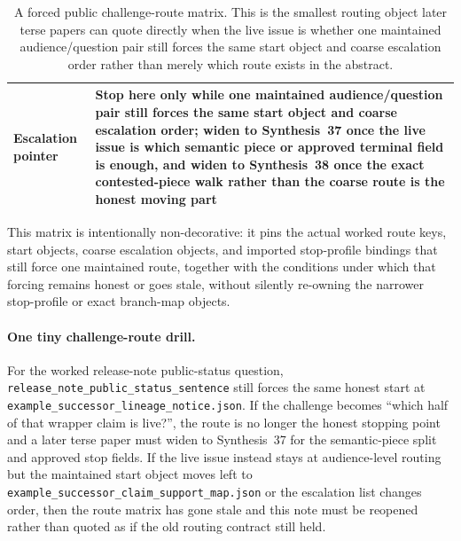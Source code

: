 \documentclass[11pt]{article}
\begin{document}
\begin{table}[t]
\begin{tabularx}{\linewidth}{@{}lX@{}}
Escalation pointer & Stop here only while one maintained audience/question pair still forces the same start object and coarse escalation order; widen to Synthesis~37 once the live issue is which semantic piece or approved terminal field is enough, and widen to Synthesis~38 once the exact contested-piece walk rather than the coarse route is the honest moving part \\
\bottomrule
\end{tabularx}
\caption{A forced public challenge-route matrix. This is the smallest routing object later terse papers can quote directly when the live issue is whether one maintained audience/question pair still forces the same start object and coarse escalation order rather than merely which route exists in the abstract.}
\label{tab:forced-public-challenge-route-matrix}
\end{table}

This matrix is intentionally non-decorative: it pins the actual worked route keys, start objects, coarse escalation objects, and imported stop-profile bindings that still force one maintained route, together with the conditions under which that forcing remains honest or goes stale, without silently re-owning the narrower stop-profile or exact branch-map objects.\cite{series:workedexample}

\paragraph{One tiny challenge-route drill.}
For the worked release-note public-status question, \nolinkurl{release_note_public_status_sentence} still forces the same honest start at \nolinkurl{example_successor_lineage_notice.json}. If the challenge becomes ``which half of that wrapper claim is live?'', the route is no longer the honest stopping point and a later terse paper must widen to Synthesis~37 for the semantic-piece split and approved stop fields. If the live issue instead stays at audience-level routing but the maintained start object moves left to \nolinkurl{example_successor_claim_support_map.json} or the escalation list changes order, then the route matrix has gone stale and this note must be reopened rather than quoted as if the old routing contract still held.\cite{series:workedexample}
\end{document}
